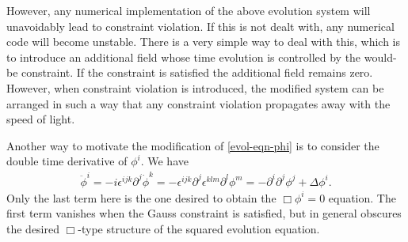 \documentclass[10pt]{report}
\theoremstyle{definition}
\newcommand{\im}{i}
\begin{document}
However, any numerical implementation of the above evolution system will unavoidably lead to constraint violation. If this is not dealt with, any numerical code will become unstable. There is a very simple way to deal with this, which is to introduce an additional field whose time evolution is controlled by the would-be constraint. If the constraint is satisfied the additional field remains zero. However, when constraint violation is introduced, the modified system can be arranged in such a way that any constraint violation propagates away with the speed of light. 

Another way to motivate the modification of \cref{evol-eqn-phi} is to consider the double time derivative of $\phi^i$. We have
\begin{align}
\ddot{\phi}^i = - \im \epsilon^{ijk} \partial^j \dot{\phi}^k = - \epsilon^{ijk} \partial^j \epsilon^{klm} \partial^l \phi^m = - \partial^i \partial^j \phi^j + \Delta \phi^i.
\end{align}
Only the last term here is the one desired to obtain the $\Box\phi^i=0$ equation. The first term vanishes when the Gauss constraint is satisfied, but in general obscures the desired $\Box$-type structure of the squared evolution equation. 
\end{document}

